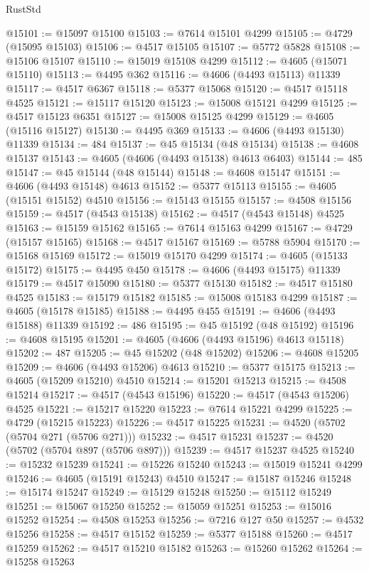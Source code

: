 \begin{lexlean}{RustStd}
\begin{coremodule}
@15101 := @15097 @15100
@15103 := @7614 @15101 @4299
@15105 := @4729 (@15095 @15103)
@15106 := @4517 @15105
@15107 := @5772 @5828
@15108 := @15106 @15107
@15110 := @15019 @15108 @4299
@15112 := @4605 (@15071 @15110)
@15113 := @4495 @362
@15116 := @4606 (@4493 @15113) @11339
@15117 := @4517 @6367
@15118 := @5377 @15068
@15120 := @4517 @15118 @4525
@15121 := @15117 @15120
@15123 := @15008 @15121 @4299
@15125 := @4517 @15123 @6351
@15127 := @15008 @15125 @4299
@15129 := @4605 (@15116 @15127)
@15130 := @4495 @369
@15133 := @4606 (@4493 @15130) @11339
@15134 := 484
@15137 := @45 @15134 (@48 @15134)
@15138 := @4608 @15137
@15143 := @4605 (@4606 (@4493 @15138) @4613 @6403)
@15144 := 485
@15147 := @45 @15144 (@48 @15144)
@15148 := @4608 @15147
@15151 := @4606 (@4493 @15148) @4613
@15152 := @5377 @15113
@15155 := @4605 (@15151 @15152) @4510
@15156 := @15143 @15155
@15157 := @4508 @15156
@15159 := @4517 (@4543 @15138)
@15162 := @4517 (@4543 @15148) @4525
@15163 := @15159 @15162
@15165 := @7614 @15163 @4299
@15167 := @4729 (@15157 @15165)
@15168 := @4517 @15167
@15169 := @5788 @5904
@15170 := @15168 @15169
@15172 := @15019 @15170 @4299
@15174 := @4605 (@15133 @15172)
@15175 := @4495 @450
@15178 := @4606 (@4493 @15175) @11339
@15179 := @4517 @15090
@15180 := @5377 @15130
@15182 := @4517 @15180 @4525
@15183 := @15179 @15182
@15185 := @15008 @15183 @4299
@15187 := @4605 (@15178 @15185)
@15188 := @4495 @455
@15191 := @4606 (@4493 @15188) @11339
@15192 := 486
@15195 := @45 @15192 (@48 @15192)
@15196 := @4608 @15195
@15201 := @4605 (@4606 (@4493 @15196) @4613 @15118)
@15202 := 487
@15205 := @45 @15202 (@48 @15202)
@15206 := @4608 @15205
@15209 := @4606 (@4493 @15206) @4613
@15210 := @5377 @15175
@15213 := @4605 (@15209 @15210) @4510
@15214 := @15201 @15213
@15215 := @4508 @15214
@15217 := @4517 (@4543 @15196)
@15220 := @4517 (@4543 @15206) @4525
@15221 := @15217 @15220
@15223 := @7614 @15221 @4299
@15225 := @4729 (@15215 @15223)
@15226 := @4517 @15225
@15231 := @4520 (@5702 (@5704 @271 (@5706 @271)))
@15232 := @4517 @15231
@15237 := @4520 (@5702 (@5704 @897 (@5706 @897)))
@15239 := @4517 @15237 @4525
@15240 := @15232 @15239
@15241 := @15226 @15240
@15243 := @15019 @15241 @4299
@15246 := @4605 (@15191 @15243) @4510
@15247 := @15187 @15246
@15248 := @15174 @15247
@15249 := @15129 @15248
@15250 := @15112 @15249
@15251 := @15067 @15250
@15252 := @15059 @15251
@15253 := @15016 @15252
@15254 := @4508 @15253
@15256 := @7216 @127 @50
@15257 := @4532 @15256
@15258 := @4517 @15152
@15259 := @5377 @15188
@15260 := @4517 @15259
@15262 := @4517 @15210 @15182
@15263 := @15260 @15262
@15264 := @15258 @15263

\end{coremodule}
\end{lexlean}
